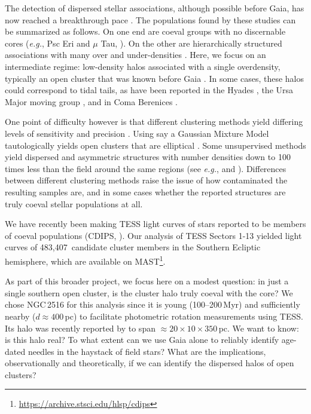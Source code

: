 \documentclass[12pt,twocolumn,tighten]{aastex63}
\newcommand{\numsouthernuniqlcs}{483{,}407} %
\begin{document}
The detection of dispersed stellar associations, although possible
before Gaia, has now reached a breakthrough pace \citep[{\it
e.g.},][]{de_zeeuw_hipparcos_1999,bergond_gravitational_2001,zuckerman_young_2004,oh_comoving_2017,cantatgaudin_gaia_2018,gagne_banyan_XII_2018,gagne_banyan_XIII_2018,kounkel_apogee2_2018,zari_3d_2018,kounkel_untangling_2019,furnkranz_comabernbhr_2019}.
The populations found by these studies can be summarized as follows.
On one end are coeval groups with no discernable cores ({\it e.g.},
Psc Eri and $\mu$ Tau,
\citealt{meingast_psceri_2019,curtis_tess_2019,gagne_mutau_2020}).  On
the other are hierarchically structured associations with many over
and under-densities  \citep[{\it e.g.} the Sco-Cen and Vela
associations][]{pecaut_star_2016,cantatgaudin_velaOB2_2019}.  Here, we
focus on an intermediate regime: low-density halos associated with a
single overdensity, typically an open cluster that was known before
Gaia
\citep[see][]{kounkel_untangling_2019,kounkel_untanglingII_2020,meingast_2021}.
In some cases, these halos could correspond to tidal tails, as have
been reported in the Hyades
\citep{meingast_hyades_2019,roser_hyades_2019}, the Ursa Major moving
group \citep{gagne_lowmassUMA_2020}, and in Coma Berenices
\citep{tang_comaber_2019}. 

One point of difficulty however is that different clustering methods
yield differing levels of sensitivity and precision
\citep{hunt_clustering_2020}.  Using say a Gaussian Mixture Model
tautologically yields open clusters that are elliptical \citep[{\it
e.g.},][]{wallace_m4_2018}.  Some unsupervised methods yield dispersed
and asymmetric structures with number densities down to 100 times less
than the field around the same regions (see {\it e.g.},
\citealt{kounkel_untangling_2019} and \citealt{meingast_2021}).
Differences between different clustering methods raise the issue of
how contaminated the resulting samples are, and in some cases whether
the reported structures are truly coeval stellar populations at all.

We have recently been making TESS light curves of stars reported to be
members of coeval populations (CDIPS, \citealt{bouma_cdipsI_2019}).
Our analysis of TESS Sectors 1-13 yielded light curves of
\numsouthernuniqlcs\ candidate cluster members in the Southern
Ecliptic hemisphere, which are available on
MAST\footnote{\url{https://archive.stsci.edu/hlsp/cdips}}.

As part of this broader project, we focus here on a modest question:
in just a single southern open cluster, is the cluster halo truly
coeval with the core?  We chose NGC\,2516 for this analysis since it
is young (100--200\,Myr) and sufficiently nearby ($d\approx400$\,pc)
to facilitate photometric rotation measurements using TESS.  Its halo
was recently reported by \citet{kounkel_untangling_2019} to span
$\approx20\times10\times350$\,pc.  We want to know: is this halo real?
To what extent can we use Gaia alone to reliably identify age-dated
needles in the haystack of field stars?  What are the implications,
observationally and theoretically, if we can identify the dispersed
halos of open clusters?
\end{document}
